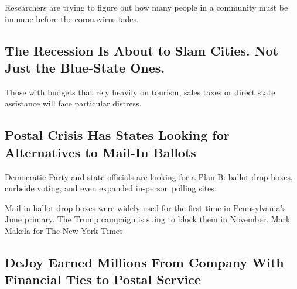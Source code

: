 Researchers are trying to figure out how many people in a community must
be immune before the coronavirus fades.

\href{/2020/08/17/upshot/pandemic-recession-cities-fiscal-shortfall.html}{}

\href{/2020/08/17/upshot/pandemic-recession-cities-fiscal-shortfall.html}{}

\hypertarget{the-recession-is-about-to-slam-cities-not-just-the-blue-state-ones}{%
\subsection{The Recession Is About to Slam Cities. Not Just the
Blue-State
Ones.}\label{the-recession-is-about-to-slam-cities-not-just-the-blue-state-ones}}

Those with budgets that rely heavily on tourism, sales taxes or direct
state assistance will face particular distress.

\href{/2020/08/17/us/politics/postal-service-voting.html}{}

\hypertarget{postal-crisis-has-states-looking-for-alternatives-to-mail-in-ballots}{%
\subsection{Postal Crisis Has States Looking for Alternatives to Mail-In
Ballots}\label{postal-crisis-has-states-looking-for-alternatives-to-mail-in-ballots}}

Democratic Party and state officials are looking for a Plan B: ballot
drop-boxes, curbside voting, and even expanded in-person polling sites.

\href{/2020/08/17/us/politics/postal-service-voting.html}{}

Mail-in ballot drop boxes were widely used for the first time in
Pennsylvania's June primary. The Trump campaign is suing to block them
in November. Mark Makela for The New York Times

\href{/2020/08/17/us/politics/dejoy-postal-service-mail-in-voting.html}{}

\hypertarget{dejoy-earned-millions-from-company-with-financial-ties-to-postal-service}{%
\subsection{DeJoy Earned Millions From Company With Financial Ties to
Postal
Service}\label{dejoy-earned-millions-from-company-with-financial-ties-to-postal-service}}

